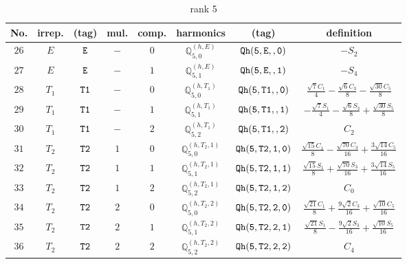\documentclass[fleqn,8pt]{jsarticle}
\begin{document}
\begin{table}[ht!]
\begin{center}
\caption{rank 5}
\renewcommand{\arraystretch}{1.3}
\begin{tabular}{cccccccc} \hline \hline
No. & irrep. & (tag) & mul. & comp. & harmonics & (tag) & definition \\ \hline
$ 26 $ & $ E $ & $ {\tt E} $ & $ - $ & $ 0 $ & $ \mathbb{Q}_{5,0}^{(h,E)} $ & $ {\tt Qh(5,E,,0)} $ & $ - S_{2} $ \\
$ 27 $ & $ E $ & $ {\tt E} $ & $ - $ & $ 1 $ & $ \mathbb{Q}_{5,1}^{(h,E)} $ & $ {\tt Qh(5,E,,1)} $ & $ - S_{4} $ \\
$ 28 $ & $ T_{1} $ & $ {\tt T1} $ & $ - $ & $ 0 $ & $ \mathbb{Q}_{5,0}^{(h,T_{1})} $ & $ {\tt Qh(5,T1,,0)} $ & $ \frac{\sqrt{7} C_{1}}{4} - \frac{\sqrt{6} C_{3}}{8} - \frac{\sqrt{30} C_{5}}{8} $ \\
$ 29 $ & $ T_{1} $ & $ {\tt T1} $ & $ - $ & $ 1 $ & $ \mathbb{Q}_{5,1}^{(h,T_{1})} $ & $ {\tt Qh(5,T1,,1)} $ & $ - \frac{\sqrt{7} S_{1}}{4} - \frac{\sqrt{6} S_{3}}{8} + \frac{\sqrt{30} S_{5}}{8} $ \\
$ 30 $ & $ T_{1} $ & $ {\tt T1} $ & $ - $ & $ 2 $ & $ \mathbb{Q}_{5,2}^{(h,T_{1})} $ & $ {\tt Qh(5,T1,,2)} $ & $ C_{2} $ \\
$ 31 $ & $ T_{2} $ & $ {\tt T2} $ & $ 1 $ & $ 0 $ & $ \mathbb{Q}_{5,0}^{(h,T_{2},1)} $ & $ {\tt Qh(5,T2,1,0)} $ & $ \frac{\sqrt{15} C_{1}}{8} - \frac{\sqrt{70} C_{3}}{16} + \frac{3 \sqrt{14} C_{5}}{16} $ \\
$ 32 $ & $ T_{2} $ & $ {\tt T2} $ & $ 1 $ & $ 1 $ & $ \mathbb{Q}_{5,1}^{(h,T_{2},1)} $ & $ {\tt Qh(5,T2,1,1)} $ & $ \frac{\sqrt{15} S_{1}}{8} + \frac{\sqrt{70} S_{3}}{16} + \frac{3 \sqrt{14} S_{5}}{16} $ \\
$ 33 $ & $ T_{2} $ & $ {\tt T2} $ & $ 1 $ & $ 2 $ & $ \mathbb{Q}_{5,2}^{(h,T_{2},1)} $ & $ {\tt Qh(5,T2,1,2)} $ & $ C_{0} $ \\
$ 34 $ & $ T_{2} $ & $ {\tt T2} $ & $ 2 $ & $ 0 $ & $ \mathbb{Q}_{5,0}^{(h,T_{2},2)} $ & $ {\tt Qh(5,T2,2,0)} $ & $ \frac{\sqrt{21} C_{1}}{8} + \frac{9 \sqrt{2} C_{3}}{16} + \frac{\sqrt{10} C_{5}}{16} $ \\
$ 35 $ & $ T_{2} $ & $ {\tt T2} $ & $ 2 $ & $ 1 $ & $ \mathbb{Q}_{5,1}^{(h,T_{2},2)} $ & $ {\tt Qh(5,T2,2,1)} $ & $ \frac{\sqrt{21} S_{1}}{8} - \frac{9 \sqrt{2} S_{3}}{16} + \frac{\sqrt{10} S_{5}}{16} $ \\
$ 36 $ & $ T_{2} $ & $ {\tt T2} $ & $ 2 $ & $ 2 $ & $ \mathbb{Q}_{5,2}^{(h,T_{2},2)} $ & $ {\tt Qh(5,T2,2,2)} $ & $ C_{4} $ \\
 \hline \hline
\end{tabular}
\end{center}
\end{table}
\end{document}
